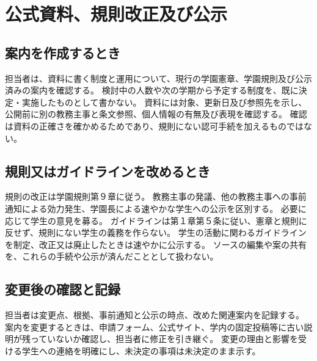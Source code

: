 ﻿\newpage
\chapter{公式資料、規則改正及び公示}

\section{案内を作成するとき}

担当者は、資料に書く制度と運用について、現行の学園憲章、学園規則及び公示済みの案内を確認する。
検討中の人数や次の学期から予定する制度を、既に決定・実施したものとして書かない。
資料には対象、更新日及び参照先を示し、公開前に別の教務主事と条文参照、個人情報の有無及び表現を確認する。
確認は資料の正確さを確かめるためであり、規則にない認可手続を加えるものではない。

\section{規則又はガイドラインを改めるとき}

規則の改正は学園規則第９章に従う。
教務主事の発議、他の教務主事への事前通知による効力発生、学園長による速やかな学生への公示を区別する。
必要に応じて学生の意見を募る。
ガイドラインは第１章第５条に従い、憲章と規則に反せず、規則にない学生の義務を作らない。
学生の活動に関わるガイドラインを制定、改正又は廃止したときは速やかに公示する。
ソースの編集や案の共有を、これらの手続や公示が済んだこととして扱わない。

\section{変更後の確認と記録}

担当者は変更点、根拠、事前通知と公示の時点、改めた関連案内を記録する。
案内を変更するときは、申請フォーム、公式サイト、学内の固定投稿等に古い説明が残っていないか確認し、担当者に修正を引き継ぐ。
変更の理由と影響を受ける学生への連絡を明確にし、未決定の事項は未決定のまま示す。
